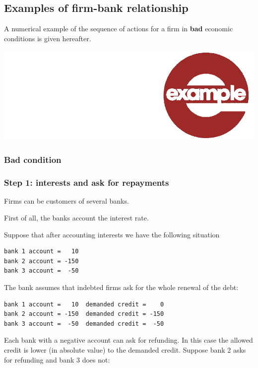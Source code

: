 \documentclass{book}
\newcommand{\doclocation}{file:///Users/giulioni/Documents/workspace/gabriele/docs}
\begin{document}
\subsection{Examples of firm-bank relationship}

A numerical example of the sequence of actions for a firm in {\bf bad} economic conditions is given hereafter.%
\begin{marginfigure}
\hskip8mm	\includegraphics[scale=0.07]{example.png}
\end{marginfigure}
\subsubsection{Bad condition}
\subsubsection*{Step 1: interests and ask for repayments}
Firms can be customers of several banks.

First of all, the banks account the interest rate.

Suppose that after accounting interests we have the following situation
\begin{verbatim}
bank 1 account =   10
bank 2 account = -150
bank 3 account =  -50
\end{verbatim}

The bank assumes that indebted firms ask for the whole renewal of the debt:

\begin{verbatim}
bank 1 account =   10  demanded credit =    0
bank 2 account = -150  demanded credit = -150
bank 3 account =  -50  demanded credit =  -50
\end{verbatim}

Each bank with a negative account can ask for refunding. In this case the allowed credit is lower (in absolute value) to the demanded credit.
Suppose bank 2 asks for refunding and bank 3 does not:
\end{document}

